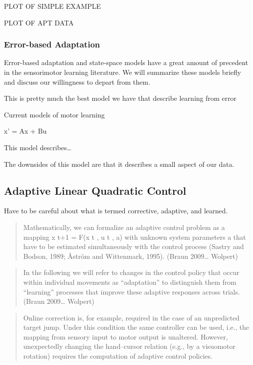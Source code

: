 \documentclass[../main.tex]{subfiles}
\begin{document}
PLOT OF SIMPLE EXAMPLE

PLOT OF APT DATA

\subsubsection{Error-based Adaptation}\label{error-based-adaptation}

Error-based adaptation and state-space models have a great amount of
precedent in the sensorimotor learning literature. We will summarize
these models briefly and discuss our willingness to depart from them.

This is pretty much the best model we have that describe learning from
error

Current models of motor learning

x' = Ax + Bu

This model describes\ldots{}

The downsides of this model are that it describes a small aspect of our
data.

\subsection{Adaptive Linear Quadratic
Control}\label{adaptive-linear-quadratic-control}

Have to be careful about what is termed corrective, adaptive, and
learned.

\begin{quote}
Mathematically, we can formalize an adaptive control problem as a
mapping x t+1 = F(x t , u t , a) with unknown system parameters a that
have to be estimated simultaneously with the control process (Sastry and
Bodson, 1989; Åström and Wittenmark, 1995). (Braun 2009\ldots{} Wolpert)
\end{quote}

\begin{quote}
In the following we will refer to changes in the control policy that
occur within individual movements as ``adaptation'' to distinguish them
from ``learning'' processes that improve these adaptive responses across
trials. (Braun 2009\ldots{} Wolpert)
\end{quote}

\begin{quote}
Online correction is, for example, required in the case of an
unpredicted target jump. Under this condition the same controller can be
used, i.e., the mapping from sensory input to motor output is unaltered.
However, unexpectedly changing the hand--cursor relation (e.g., by a
visuomotor rotation) requires the computation of adaptive control
policies.
\end{quote}
\end{document}
